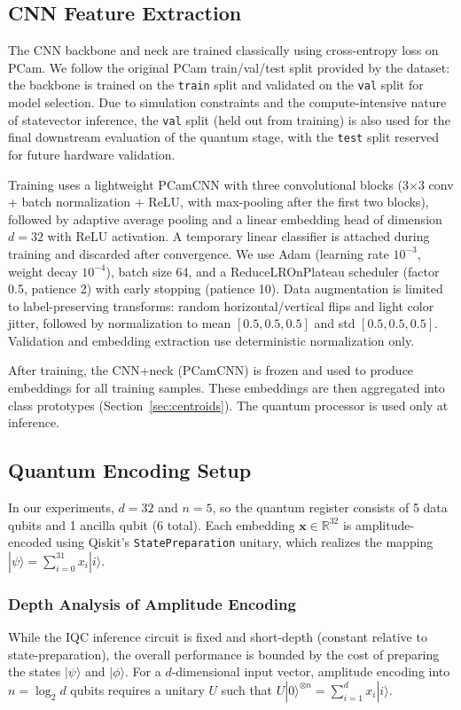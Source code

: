 \documentclass[conference]{IEEEtran}
\begin{document}
\subsection{CNN Feature Extraction}
The CNN backbone and neck are trained classically using cross-entropy loss on PCam. We follow the original PCam train/val/test split provided by the dataset: the backbone is trained on the \texttt{train} split and validated on the \texttt{val} split for model selection. Due to simulation constraints and the compute-intensive nature of statevector inference, the \texttt{val} split (held out from training) is also used for the final downstream evaluation of the quantum stage, with the \texttt{test} split reserved for future hardware validation.

Training uses a lightweight PCamCNN with three convolutional blocks (3$\times$3 conv + batch normalization + ReLU, with max-pooling after the first two blocks), followed by adaptive average pooling and a linear embedding head of dimension $d=32$ with ReLU activation. A temporary linear classifier is attached during training and discarded after convergence. We use Adam (learning rate $10^{-3}$, weight decay $10^{-4}$), batch size 64, and a ReduceLROnPlateau scheduler (factor 0.5, patience 2) with early stopping (patience 10). Data augmentation is limited to label-preserving transforms: random horizontal/vertical flips and light color jitter, followed by normalization to mean $[0.5,0.5,0.5]$ and std $[0.5,0.5,0.5]$. Validation and embedding extraction use deterministic normalization only.

After training, the CNN+neck (PCamCNN) is frozen and used to produce embeddings for all training samples. These embeddings are then aggregated into class prototypes (Section~\ref{sec:centroids}). The quantum processor is used only at inference.

\subsection{Quantum Encoding Setup}
In our experiments, $d = 32$ and $n = 5$, so the quantum register consists of 5 data qubits and 1 ancilla qubit (6 total). Each embedding $\mathbf{x} \in \mathbb{R}^{32}$ is amplitude-encoded using Qiskit's \texttt{StatePreparation} unitary, which realizes the mapping $|\psi\rangle = \sum_{i=0}^{31} x_i|i\rangle$.

\subsubsection{Depth Analysis of Amplitude Encoding}
While the IQC inference circuit is fixed and short-depth (constant relative to state-preparation), the overall performance is bounded by the cost of preparing the states $|\psi\rangle$ and $|\phi\rangle$. For a $d$-dimensional input vector, amplitude encoding into $n = \log_2 d$ qubits requires a unitary $U$ such that $U|0\rangle^{\otimes n} = \sum_{i=1}^d x_i |i\rangle$.
\end{document}
